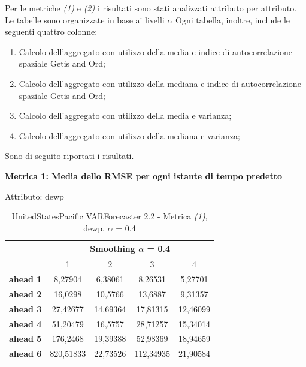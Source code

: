 \documentclass[12pt,a4paper,oneside,openright]{book}
\begin{document}
Per le metriche \textit{(1)} e \textit{(2)} i risultati sono stati analizzati attributo per attributo. Le tabelle sono organizzate in base ai livelli $\alpha$ Ogni tabella, inoltre, include le seguenti quattro colonne:

\begin{enumerate}
\item Calcolo dell'aggregato con utilizzo della media e indice di autocorrelazione spaziale Getis and Ord;
\item Calcolo dell'aggregato con utilizzo della mediana e indice di autocorrelazione spaziale Getis and Ord;
\item Calcolo dell'aggregato con utilizzo della media e varianza;
\item Calcolo dell'aggregato con utilizzo della mediana e varianza;
\end{enumerate}

Sono di seguito riportati i risultati.

\medskip

\textbf{Metrica 1: Media dello RMSE per ogni istante di tempo predetto} \medskip

Attributo: dewp \\ 

\begin{table}[H]
\centering
\begin{tabular}{|c|c|c|c|c|}
\hline
 & \multicolumn{4}{|c|}{Smoothing $\alpha$ = 0.4} \\
\hline
& 1 & 2 & 3 & 4 \\
\hline
\textbf{ahead 1} & 8,27904 & 6,38061 & 8,26531 & 5,27701 \\
\hline
\textbf{ahead 2} & 16,0298 & 10,5766 & 13,6887 & 9,31357\\ 
\hline
\textbf{ahead 3} & 27,42677 & 14,69364 & 17,81315 & 12,46099\\
\hline
\textbf{ahead 4} & 51,20479 & 16,5757 & 28,71257 & 15,34014\\ 
\hline
\textbf{ahead 5} & 176,2468 & 19,39388 & 52,98369 & 18,94659\\
\hline
\textbf{ahead 6} & 820,51833 & 22,73526 & 112,34935 & 21,90584\\ 
\hline
\end{tabular} \\
\caption{UnitedStatesPacific VARForecaster 2.2 - Metrica \textit{(1)}, dewp, $\alpha$ = 0.4}
\end{table} 

\newpage
\end{document}
